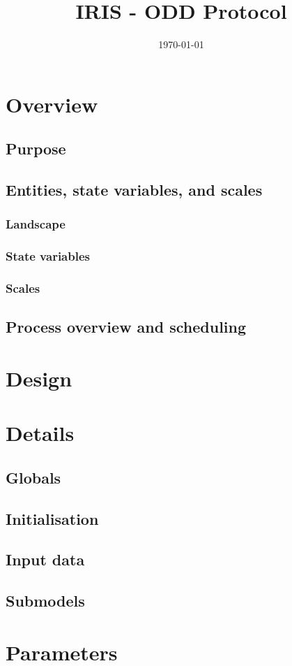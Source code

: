 \documentclass[a4paper, 11pt]{article}
\title{IRIS - ODD Protocol}
\author{}
\date{\today}
\begin{document}
	
\maketitle
\tableofcontents

\section{Overview}

\subsection{Purpose}

\subsection{Entities, state variables, and scales}

\subsubsection{Landscape}

\subsubsection{State variables}

\subsubsection{Scales}

\subsection{Process overview and scheduling}

\section{Design}

\section{Details}

\subsection{Globals}

\subsection{Initialisation}

\subsection{Input data}

\subsection{Submodels}

\section{Parameters}
\end{document}
